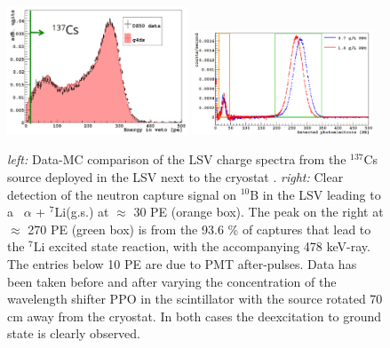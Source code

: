 \begin{figure}[htbp]
\centering
\includegraphics[width=0.48\textwidth]{./Figures/137Cs_Veto_Paolo_G4DS_UCLA.png}
\includegraphics[width=0.48\textwidth]{./Figures/AmBe_LSV_VetoPaper.png}
\caption{\textit{left:} Data-MC comparison of the LSV charge spectra from the $^{137}$Cs source deployed in the LSV next to the cryostat \cite{DS50:G4DS:paper}.
\textit{right:} Clear detection of the neutron capture signal on $^{10}$B in the LSV leading to a \enbortengroundalpha\ $\alpha$ + $^7$Li(g.s.) at $\approx$ 30 PE (orange box). The
peak on the right at $\approx$ 270 PE (green box) is from the 93.6 \% of captures that lead to the $^7$Li excited state reaction, with the accompanying 478 keV-ray. The entries below 10 PE are due to PMT after-pulses. Data has been taken before and after varying the concentration of the wavelength shifter PPO in the scintillator with the source rotated 70 cm away from the cryostat. In both cases the deexcitation to ground state is clearly observed.\cite{Agnes:2015qyz}
\label{fig:LSV:Calib}} 
\end{figure}
